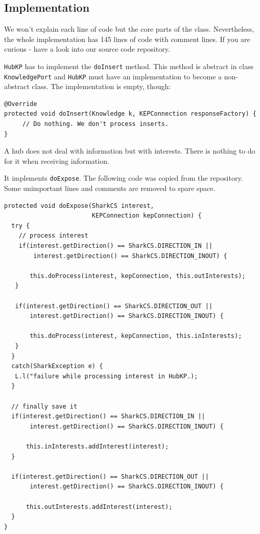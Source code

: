 {\subsection{Implementation}
We won't explain each line of code but the core parts of the class. Nevertheless, the whole implementation has 145 lines of code with comment lines.
If you are curious - have a look into our source code repository.

{\tt HubKP} has to implement the {\tt doInsert} method. This method is abstract in class {\tt KnowledgePort} and {\tt HubKP} must have an implementation to become a non-abstract class. The implementation is empty, though:

\begin{verbatim}
@Override
protected void doInsert(Knowledge k, KEPConnection responseFactory) {
     // Do nothing. We don't process inserts.
}
\end{verbatim}

A hub does not deal with information but with interests. There is nothing to do for it when receiving information.

It implements {\tt doExpose}. The following code was copied from
the repository. Some unimportant lines and comments are removed to
spare space.

\begin{verbatim}
protected void doExpose(SharkCS interest,
                        KEPConnection kepConnection) {
  try {
    // process interest
    if(interest.getDirection() == SharkCS.DIRECTION_IN ||
        interest.getDirection() == SharkCS.DIRECTION_INOUT) {

       this.doProcess(interest, kepConnection, this.outInterests);
   }

   if(interest.getDirection() == SharkCS.DIRECTION_OUT ||
       interest.getDirection() == SharkCS.DIRECTION_INOUT) {

       this.doProcess(interest, kepConnection, this.inInterests);
   }
  }
  catch(SharkException e) {
   L.l("failure while processing interest in HubKP.);
  }

  // finally save it
  if(interest.getDirection() == SharkCS.DIRECTION_IN ||
       interest.getDirection() == SharkCS.DIRECTION_INOUT) {

      this.inInterests.addInterest(interest);
  }

  if(interest.getDirection() == SharkCS.DIRECTION_OUT ||
       interest.getDirection() == SharkCS.DIRECTION_INOUT) {

      this.outInterests.addInterest(interest);
  }
}
\end{verbatim}

}
